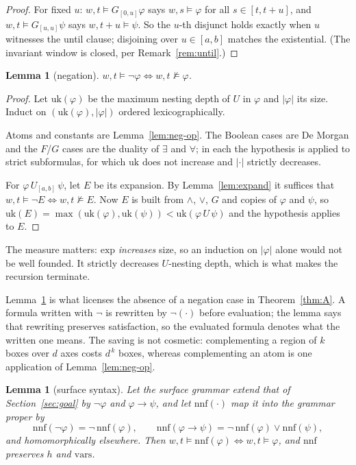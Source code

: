 \documentclass[11pt,a4paper]{article}
\theoremstyle{plain}
\newtheorem{lemma}[theorem]{Lemma}
\theoremstyle{definition}
\theoremstyle{remark}
\begin{document}
\begin{proof}
For fixed $u$: $w,t \models G_{[0,u]}\varphi$ says $w,s \models \varphi$ for all
$s \in [t, t{+}u]$, and $w,t \models G_{[u,u]}\psi$ says $w,t{+}u \models \psi$.
So the $u$-th disjunct holds exactly when $u$ witnesses the until clause;
disjoining over $u \in [a,b]$ matches the existential. (The invariant window is
closed, per Remark~\ref{rem:until}.)
\end{proof}

\begin{lemma}[negation]\label{lem:neg}
$w,t \models \lnot\varphi \iff w,t \not\models \varphi$.
\end{lemma}

\begin{proof}
Let $\mathrm{uk}(\varphi)$ be the maximum nesting depth of $U$ in $\varphi$ and
$|\varphi|$ its size. Induct on $(\mathrm{uk}(\varphi), |\varphi|)$ ordered
lexicographically.

Atoms and constants are Lemma~\ref{lem:neg-op}. The Boolean cases are De
Morgan and the $F$/$G$ cases are the duality of $\exists$ and $\forall$; in each
the hypothesis is applied to strict subformulas, for which $\mathrm{uk}$ does
not increase and $|\cdot|$ strictly decreases.

For $\varphi\,U_{[a,b]}\,\psi$, let $E$ be its expansion. By
Lemma~\ref{lem:expand} it suffices that $w,t \models \lnot E \iff w,t
\not\models E$. Now $E$ is built from $\wedge$, $\vee$, $G$ and copies of
$\varphi$ and $\psi$, so
$\mathrm{uk}(E) = \max(\mathrm{uk}(\varphi), \mathrm{uk}(\psi)) <
\mathrm{uk}(\varphi\,U\,\psi)$ and the hypothesis applies to $E$.
\end{proof}

The measure matters: $\mathrm{exp}$ \emph{increases} size, so an induction on
$|\varphi|$ alone would not be well founded. It strictly decreases $U$-nesting
depth, which is what makes the recursion terminate.

Lemma~\ref{lem:neg} is what licenses the absence of a negation case in
Theorem~\ref{thm:A}. A formula written with $\lnot$ is rewritten by
$\lnot(\cdot)$ before evaluation; the lemma says that rewriting preserves
satisfaction, so the evaluated formula denotes what the written one means. The
saving is not cosmetic: complementing a region of $k$ boxes over $d$ axes costs
$d^{\,k}$ boxes, whereas complementing an atom is one application of
Lemma~\ref{lem:neg-op}.

\begin{lemma}[surface syntax]\label{lem:nnf}
Let the \emph{surface} grammar extend that of Section~\ref{sec:goal} by
$\lnot\varphi$ and $\varphi \to \psi$, and let $\mathrm{nnf}(\cdot)$ map it into
the grammar proper by
\[
  \mathrm{nnf}(\lnot\varphi) = \lnot\,\mathrm{nnf}(\varphi), \qquad
  \mathrm{nnf}(\varphi \to \psi) = \lnot\,\mathrm{nnf}(\varphi) \vee
  \mathrm{nnf}(\psi),
\]
and homomorphically elsewhere. Then $w,t \models \mathrm{nnf}(\varphi) \iff w,t
\models \varphi$, and $\mathrm{nnf}$ preserves $h$ and $\mathrm{vars}$.
\end{lemma}
\end{document}
